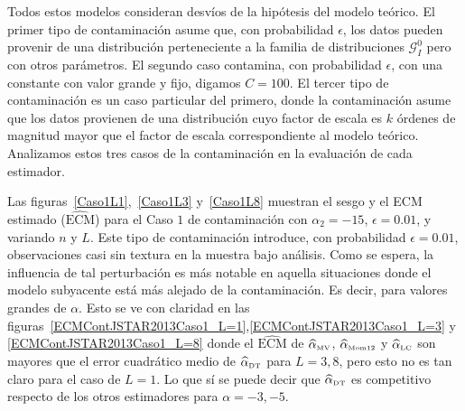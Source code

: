 Todos estos modelos consideran desvíos de la hipótesis del modelo teórico. El primer tipo de contaminación asume que, con probabilidad $\epsilon$, los datos pueden provenir de una distribución perteneciente a la familia de distribuciones $\mathcal{G}_I^0$ pero con otros parámetros. El segundo caso contamina, con probabilidad $\epsilon$, con una constante con valor grande y fijo, digamos $C=100$. El tercer tipo de contaminación es un caso particular del primero, donde la contaminación asume que los datos provienen de una distribución cuyo factor de escala es $k$ órdenes de magnitud mayor que el factor de escala correspondiente al modelo teórico. Analizamos estos tres casos de la contaminación en la evaluación de cada estimador.


Las figuras~\ref{Caso1L1},~\ref{Caso1L3} y~\ref{Caso1L8} muestran el sesgo y el ECM estimado ($\widehat{\text{ECM}}$) para el Caso $1$ de contaminación con $\alpha_2=-15$, $\epsilon=0.01$, y variando $n$ y $L$.  
Este tipo de contaminación introduce, con probabilidad $\epsilon=0.01$, observaciones casi sin textura en la muestra bajo análisis. Como se espera, la influencia de tal perturbación es más notable en aquella situaciones donde el modelo subyacente está más alejado de la contaminación. Es decir, para valores grandes de $\alpha$. Esto se ve con claridad en las figuras~\ref{ECMContJSTAR2013Caso1_L=1},\ref{ECMContJSTAR2013Caso1_L=3} y \ref{ECMContJSTAR2013Caso1_L=8} donde el $\widehat{\text{ECM}}$ de $\widehat{\alpha}_{\text{\tiny{MV}}}$, $\widehat\alpha_{\text{\tiny{Mom12}}}$ y $\widehat\alpha_{\text{\tiny{LC}}}$ son mayores que el error cuadrático medio de $\widehat\alpha_{\text{\tiny{DT}}}$ para $L=3,8$, pero esto no es tan claro para el caso de $L=1$. Lo que sí se puede decir que $\widehat\alpha_{\text{\tiny{DT}}}$ es competitivo respecto de los otros estimadores para $\alpha=-3,-5$.

